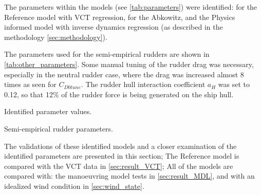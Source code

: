 The parameters within the models (see \autoref{tab:parameters}) were identified: for the Reference model with VCT regression, for the Abkowitz, and the Physics informed model with inverse dynamics regression (as described in the methodology \autoref{sec:methodology}). 

The parameters used for the semi-empirical rudders are shown in \autoref{tab:other_parameters}. Some manual tuning of the rudder drag was necessary, especially in the neutral rudder case, where the drag was increased almost 8 times as seen for $C_{D0tune}$. The rudder hull interaction coefficient $a_H$ was set to 0.12, so that 12\% of the rudder force is being generated on the ship hull.
\begin{table}[h]
    \centering
    \caption{Identified parameter values.}
    \label{tab:parameters}
\end{table}
\begin{table}[h]
    \centering
    \caption{Semi-empirical rudder parameters.}
    \label{tab:other_parameters}
\end{table}

The validations of these identified models and a closer examination of the identified parameters are presented in this section; The Reference model is compared with the VCT data in \autoref{sec:result_VCT}; All of the models are compared with: the manoeuvring model tests in \autoref{sec:result_MDL}, and with an idealized wind condition in \autoref{sec:wind_state}.